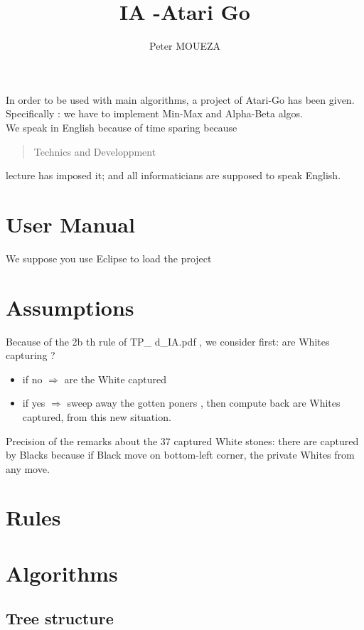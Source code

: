 \documentclass{book}
\newcommand{\tmtextbf}[1]{{\bfseries{#1}}}
\begin{document}
\title{IA -Atari Go}
\author{Peter MOUEZA}
\maketitle


In order to be used with main algorithms, a project of Atari-Go has been given.
Specifically : we have to implement Min-Max  and Alpha-Beta algos.\\
We speak in English because of time sparing because \begin{quotation}
Technics and Developpment
\end{quotation} lecture has imposed it; and all informaticians are supposed to speak English.


\chapter{User Manual}

We suppose you use Eclipse to load the project  
\chapter{Assumptions}
Because of the 2b th rule of 
TP\_
d\_IA.pdf , we consider first: are Whites capturing 
?\\
\begin{itemize}
\item if no 
$
\Rightarrow
$
are the White captured
\item if yes 
$
\Rightarrow
$
sweep away the gotten poners , then compute back are Whites captured, from this new situation.
\end{itemize}

Precision of the remarks about the 37 captured White stones: there are captured by Blacks because if Black move on bottom-left corner, the private Whites from any move.
\chapter{Rules}
\chapter{Algorithms}

\section{Tree structure}
\end{document}

